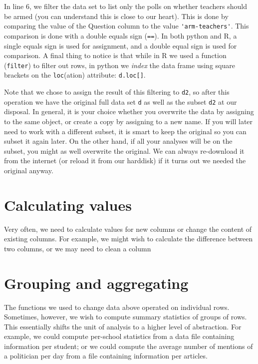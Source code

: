 In line 6, we filter the data set to list only the polls on whether teachers should be armed
(you can understand this is close to our heart).
This is done by comparing the value of the Question column to the value \verb+'arm-teachers'+.
This comparison is done with a double equals sign (\verb+==+).
In both python and R, a single equals sign is used for assignment,
and a double equal sign is used for comparison.
A final thing to notice is that while in R we used a function (\verb+filter+) to filter out rows,
in python we \emph{index} the data frame using square brackets on the \verb+loc+(ation) attribute: \verb+d.loc[]+.

Note that we chose to assign the result of this filtering to \verb+d2+,
so after this operation we have the original full data set \verb+d+ as well as the subset \verb+d2+ at our disposal.
In general, it is your choice whether you overwrite the data by assigning to the same object,
or create a copy by assigning to a new name.
If you will later need to work with a different subset, it is smart to keep the original so you can subset it again later.
On the other hand, if all your analyses will be on the subset, you might as well overwrite the original.
We can always re-download it from the internet (or reload it from our harddisk) if it turns out we needed the original anyway. 



\section{Calculating values}

Very often, we need to calculate values for new columns or change the content of existing columns.
For example, we might wish to calculate the difference between two columns,
or we may need to clean a column



\section{Grouping and aggregating}

The functions we used to change data above operated on individual rows.
Sometimes, however, we wish to compute summary statistics of groups of rows.
This essentially shifts the unit of analysis to a higher level of abstraction.
For example, we could compute per-school statistics from a data file containing information per student;
or we could compute the average number of mentions of a politician per day from a file containing information per articles.

